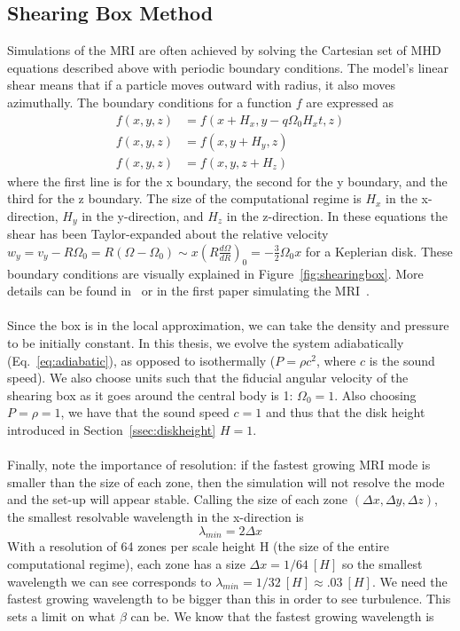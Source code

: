 \subsection{Shearing Box Method}\label{ssec:shearingbox}
Simulations of the MRI are often achieved by solving the Cartesian set of MHD equations described above with periodic boundary conditions. The model's linear shear means that if a particle moves outward with radius, it also moves azimuthally. The boundary conditions for a function $f$ are expressed as
\begin{align*}
  f(x,y,z)&=f(x+H_x,y-q\Omega_0H_xt,z)\\
  f(x,y,z)&=f(x,y+H_y,z)\\
  f(x,y,z)&=f(x,y,z+H_z)
\end{align*}
where the first line is for the x boundary, the second for the y boundary, and the third for the z boundary. The size of the computational regime is $H_x$ in the x-direction, $H_y$ in the y-direction, and $H_z$ in the z-direction. In these equations the shear has been Taylor-expanded about the relative velocity $w_y=v_y-R\Omega_0=R(\Omega-\Omega_0)\sim x\left(R\frac{d\Omega}{dR}\right)_0=-\frac32\Omega_0x$ for a Keplerian disk. These boundary conditions are visually explained in Figure~\ref{fig:shearingbox}. More details can be found in~\citet{BH1998} or in the first paper simulating the MRI~\cite{HB3}. \\
\\
Since the box is in the local approximation, we can take the density and pressure to be initially constant. In this thesis, we evolve the system adiabatically (Eq.~\ref{eq:adiabatic}), as opposed to isothermally ($P=\rho c^2$, where $c$ is the sound speed). We also choose units such that the fiducial angular velocity of the shearing box as it goes around the central body is 1: $\Omega_0=1$. Also choosing $P=\rho=1$, we have that the sound speed $c=1$ and thus that the disk height introduced in Section~\ref{ssec:diskheight} $H=1$. \\
\\
Finally, note the importance of resolution: if the fastest growing MRI mode is smaller than the size of each zone, then the simulation will not resolve the mode and the set-up will appear stable. Calling the size of each zone $(\Delta x,\Delta y,\Delta z)$, the smallest resolvable wavelength in the x-direction is
\begin{equation*}
  \lambda_{min}=2\Delta x
\end{equation*}
With a resolution of 64 zones per scale height H (the size of the entire computational regime), each zone has a size $\Delta x=1/64~[H]$ so the smallest wavelength we can see corresponds to $\lambda_{min}=1/32~[H]\approx.03~[H]$. We need the fastest growing wavelength to be bigger than this in order to see turbulence. This sets a limit on what $\beta$ can be. We know that the fastest growing wavelength is
